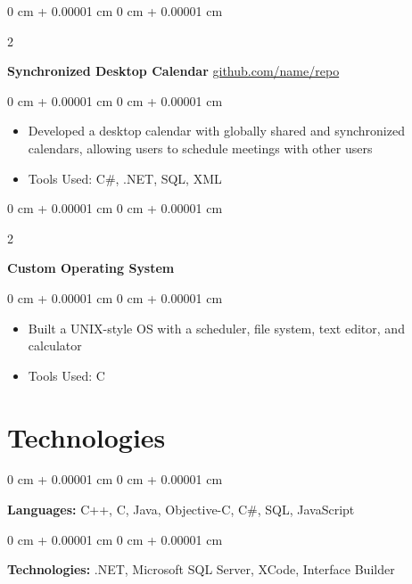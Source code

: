 \documentclass[10pt, letterpaper]{article}
\newenvironment{highlights}{
    \begin{itemize}[
        topsep=0.10 cm,
        parsep=0.10 cm,
        partopsep=0pt,
        itemsep=0pt,
        leftmargin=0 cm + 10pt
    ]
}{
    \end{itemize}
} %
\newenvironment{onecolentry}{
    \begin{adjustwidth}{
        0 cm + 0.00001 cm
    }{
        0 cm + 0.00001 cm
    }
}{
    \end{adjustwidth}
} %
\newenvironment{twocolentry}[2][]{
    \onecolentry
    \def\secondColumn{#2}
    \setcolumnwidth{\fill, 4.5 cm}
    \begin{paracol}{2}
}{
    \switchcolumn \raggedleft \secondColumn
    \end{paracol}
    \endonecolentry
} %
\begin{document}
							
							\vspace{0.2 cm}
							
							\begin{twocolentry}{
									\href{https://github.com/sinaatalay/rendercv}{github.com/name/repo}
								}
								\textbf{Synchronized Desktop Calendar}\end{twocolentry}
								
								\vspace{0.10 cm}
								\begin{onecolentry}
									\begin{highlights}
										\item Developed a desktop calendar with globally shared and synchronized calendars, allowing users to schedule meetings with other users
										\item Tools Used: C\#, .NET, SQL, XML
									\end{highlights}
								\end{onecolentry}
								
								
								\vspace{0.2 cm}
								
								\begin{twocolentry}{
										2002
									}
									\textbf{Custom Operating System}\end{twocolentry}
									
									\vspace{0.10 cm}
									\begin{onecolentry}
										\begin{highlights}
											\item Built a UNIX-style OS with a scheduler, file system, text editor, and calculator
											\item Tools Used: C
										\end{highlights}
									\end{onecolentry}
									
									
									
									    
									\section{Technologies}
									
									
									
									        
									\begin{onecolentry}
										\textbf{Languages:} C++, C, Java, Objective-C, C\#, SQL, JavaScript
									\end{onecolentry}
									
									\vspace{0.2 cm}
									
									\begin{onecolentry}
										\textbf{Technologies:} .NET, Microsoft SQL Server, XCode, Interface Builder
									\end{onecolentry}
									
									
									    
									
\end{document}
